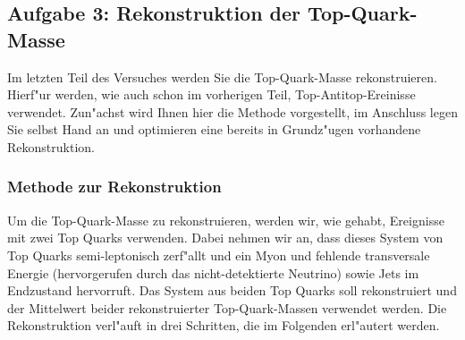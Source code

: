 \subsection{Aufgabe 3: Rekonstruktion der Top-Quark-Masse}
\label{topreco}

Im letzten Teil des Versuches werden Sie die Top-Quark-Masse rekonstruieren. Hierf"ur werden, wie auch schon im vorherigen Teil, Top-Antitop-Ereinisse verwendet. Zun"achst wird Ihnen hier die Methode vorgestellt, im Anschluss legen Sie selbst Hand an und optimieren eine bereits in Grundz"ugen vorhandene Rekonstruktion.

\subsubsection{Methode zur Rekonstruktion}
\label{subsec:topreco_intro}

Um die Top-Quark-Masse zu rekonstruieren, werden wir, wie gehabt, Ereignisse mit zwei Top Quarks verwenden. Dabei nehmen wir an, dass dieses System von Top Quarks semi-leptonisch zerf"allt und ein Myon und fehlende transversale Energie (hervorgerufen durch das nicht-detektierte Neutrino) sowie Jets im Endzustand hervorruft. Das System aus beiden Top Quarks soll rekonstruiert und der Mittelwert beider rekonstruierter Top-Quark-Massen verwendet werden. Die Rekonstruktion verl"auft in drei Schritten, die im Folgenden erl"autert werden.

